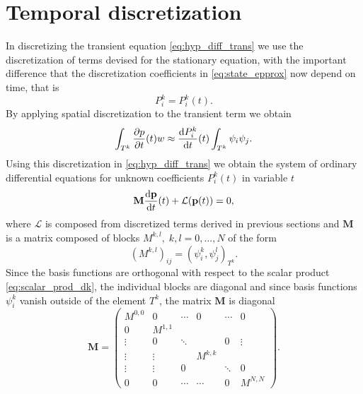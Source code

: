 \section{Temporal discretization}
\label{se:time_theory}
%
In discretizing the transient equation \eqref{eq:hyp_diff_trans} we use the
discretization of terms devised for the stationary equation, with the important
difference that the discretization coefficients in \eqref{eq:state_epprox} now
depend on time, that is
\begin{equation}
P^k_i = P^k_i(t).
\end{equation}
By applying spatial discretization to the transient term we obtain
\begin{equation}
\int_{T^k}\frac{\partial p}{\partial t}(t)w \approx  \frac{\text{d}P^k_i}{\text{d}t}(t)\int_{T^k}\psi_i\psi_j.
\end{equation}
Using this discretization in \eqref{eq:hyp_diff_trans} we obtain the system of
ordinary differential equations for unknown coefficients
$P^k_i(t)$ in variable $t$
\begin{equation}
\label{eq:time_diff}
\mathbf{M}  \frac{\text{d}\mathbf{p}}{\text{d}t}(t) + \mathcal{L}(\mathbf{p}(t)) = 0,
\end{equation}
where $\mathcal{L}$  is composed from discretized terms  derived in previous
sections and $\mathbf{M}$ is a matrix composed of blocks $M^{k,l},\; k,l=0,
\ldots , N$ of the
form
\begin{equation}
(M^{k,l})_{ij} = ( \psi^k_i,\psi^l_j)_{T^k}.
\end{equation}
Since the basis functions are orthogonal with respect to the scalar product
\eqref{eq:scalar_prod_dk}, the individual blocks are diagonal and since basis
functions $\psi^k_i$ vanish outside of the element $T^k$, the matrix $\mathbf{M}$
is diagonal
\begin{equation}
\mathbf{M}  = \begin{pmatrix}
M^{0,0}      &    0   &\cdots&  0   &\cdots&0\\
0         &   M^{1,1}  &      &      &      &\\
\vdots     &    0   &\ddots&      &  0   &\vdots\\
\vdots     & \vdots &      & M^{k,k}  &      &\\
\vdots   & \vdots & 0    &      &\ddots&0\\
0         &   0    &\cdots&\cdots&   0  &M^{N,N}
\end{pmatrix}.
\end{equation}
